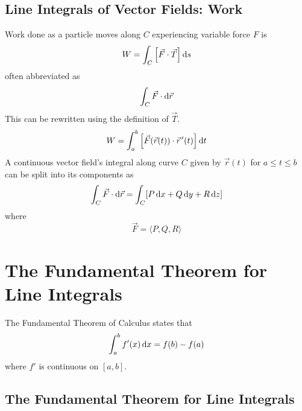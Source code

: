 \documentclass[./Calculus \Roman{3}.tex]{subfiles}
\begin{document}
		\subsection*{Line Integrals of Vector Fields: Work}
			Work done as a particle moves along $C$ experiencing variable force $F$ is
				\[W = \int_C \left[\vec{F} \cdot \vec{T}\right]\mathrm{d} s\]
				often abbreviated as
				\[\int_C \vec{F} \cdot \mathrm{d}\vec{r}\]
				This can be rewritten using the definition of $\vec{T}$.
				\[W = \int_a^b\left[\vec{F}(\vec{r}(t)) \cdot \vec{r}\hspace{0.5mm}'(t)\right]\mathrm{d} t\]
			A continuous vector field's integral along curve $C$ given by $\vec{r}(t)$ for $a \le t \le b$ can be split into its components as
				\[\int_C \vec{F} \cdot \mathrm{d}\vec{r} = \int_C[P\,\mathrm{d} x + Q\,\mathrm{d} y + R\,\mathrm{d} z]\]
				where
				\[\vec{F} = \langle P, Q, R \rangle\]
	\section{The Fundamental Theorem for Line Integrals}
		The Fundamental Theorem of Calculus states that
			\[\int_a^b f'(x)\,\mathrm{d} x = f(b) - f(a)\]
			where $f'$ is continuous on $[a, b]$.
		\subsection*{The Fundamental Theorem for Line Integrals}
\end{document}
